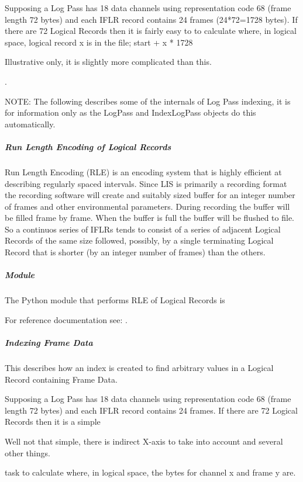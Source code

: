 \documentclass[letterpaper,10pt,english]{sphinxmanual}
\begin{document}
Supposing a Log Pass has 18 data channels using representation code 68 (frame length 72 bytes) and each IFLR record contains 24 frames (24*72=1728 bytes). If there are 72 Logical Records then it is fairly easy to to calculate where, in logical space, logical record x is in the file; start + x * 1728 %
\begin{footnote}[1]\sphinxAtStartFootnote
Illustrative only, it is slightly more complicated than this.
%
\end{footnote}.

NOTE: The following describes some of the internals of Log Pass indexing, it is for information only as the LogPass and IndexLogPass objects do this automatically.


\subparagraph{Run Length Encoding of Logical Records}
\label{\detokenize{tech/LIS_indexing:run-length-encoding-of-logical-records}}
Run Length Encoding (RLE) is an encoding system that is highly efficient at describing regularly spaced intervals. Since LIS is primarily a recording format the recording software will create and suitably sized buffer for an integer number of frames and other environmental parameters. During recording the buffer will be filled frame by frame. When the buffer is full the buffer will be flushed to file. So a continuos series of IFLRs tends to consist of a series of adjacent Logical Records of the same size followed, possibly, by a single terminating Logical Record that is shorter (by an integer number of frames) than the others.


\subparagraph{Module}
\label{\detokenize{tech/LIS_indexing:id2}}
The Python module that performs RLE of Logical Records is 

For reference documentation see: {\hyperref[\detokenize{ref/LIS/core/Rle:totaldepth-lis-core-rle}]{}}.


\subparagraph{Indexing Frame Data}
\label{\detokenize{tech/LIS_indexing:indexing-frame-data}}
This describes how an index is created to find arbitrary values in a Logical Record containing Frame Data.

Supposing a Log Pass has 18 data channels using representation code 68 (frame length 72 bytes) and each IFLR record contains 24 frames. If there are 72 Logical Records then it is a simple %
\begin{footnote}[2]\sphinxAtStartFootnote
Well not that simple, there is indirect X-axis to take into account and several other things.
%
\end{footnote} task to calculate where, in logical space, the bytes for channel x and frame y are.
\end{document}
